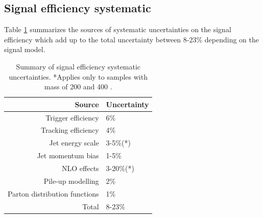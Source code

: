 \subsection{Signal efficiency systematic}

Table \ref{tab:signalsystematics} summarizes the sources of systematic uncertainties on the signal efficiency
which add up to the total uncertainty between 8-23\% depending on the signal model.

\begin{table}[htbp]
\centering
 \begin{tabular}{r|l}
  Source & Uncertainty \\
  \hline
  Trigger efficiency & 6\% \\
  Tracking efficiency & 4\% \\
  Jet energy scale & 3-5\%(*) \\
  Jet momentum bias & 1-5\% \\ 
  NLO effects & 3-20\%(*) \\ 
  Pile-up modelling & 2\% \\
  Parton distribution functions & 1\% \\
  \hline
 Total & 8-23\% \\
 \end{tabular}
\caption{Summary of signal efficiency systematic uncertainties. *Applies only to samples with
 \Higgs mass of 200 and 400 \GeVcc.
\label{tab:signalsystematics}}
\end{table} 
